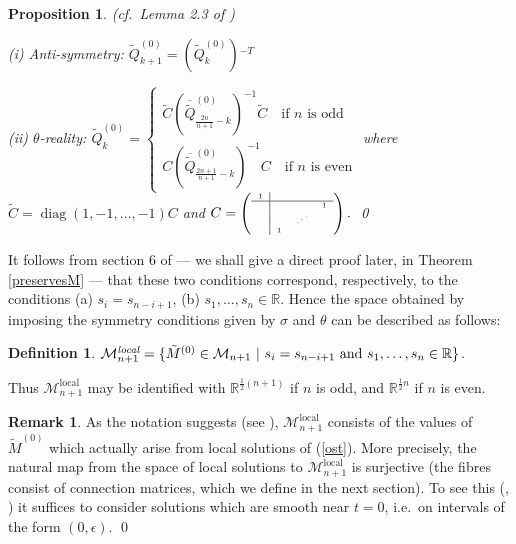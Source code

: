 \documentclass[a4paper,12pt,leqno]{amsart}
\numberwithin{equation}{section}
\theoremstyle{plain}
\newtheorem{proposition}[theorem]{Proposition}
\newtheorem{definition}[theorem]{Definition}
\theoremstyle{definition}
\newtheorem{remark}[theorem]{Remark}
\newcommand{\R}{\mathbb R}
\newcommand{\si}{\sigma}
\newcommand{\eps}{\epsilon}
\renewcommand{\th}{\theta}
\DeclareMathOperator{\diag}{diag}
\newcommand{\cM}{\mathcal{M}}
\newcommand{\st}{\ \vert\ }
\newcommand{\tQz}{  \tilde Q^{(0)}  }
\newcommand{\tMz}{  \tilde M^{(0)}  }
\newcommand{\tC}{  \tilde C }
\newcommand{\bartQz}{  {\overline{\tilde Q}}^{(0)}  }
\begin{document}
\begin{proposition}\label{sithM} (cf.\ Lemma 2.3 of \cite{GIL2})

\noindent (i) Anti-symmetry:     $\tQz_{k+1} = (\tQz_k){}^{-T}$

\noindent (ii) $\theta$-reality:   $\tQz_k=
\begin{cases}
\tC
\left(
\bartQz_{ \scriptstyle\frac{2n}{n+1}-k}
\right)^{-1}
\tC
\quad\text{if $n$ is odd}
\\
C
\left(
\bartQz_{ \scriptstyle\frac{2n+1}{n+1}-k}
\right)^{-1}
C
\quad\text{if $n$ is even}
\end{cases}
$
\newline
where
$\tC
= \diag(1,-1,\dots,-1)C$ and
$
C=
\tiny
\left(
\begin{array}{c|ccc}
1 & & &  \\
\hline
  &  &  & 1 \\
  &  &  \iddots &  \\
  & 1 &  &
\end{array}
\right).
$
\qed
\end{proposition}

It follows from section 6 of \cite{GILX}
--- we shall give a direct proof later, in Theorem \ref{preservesM} ---
that these two conditions correspond, respectively, to the conditions
(a) $s_i=s_{n-i+1}$, (b) $s_1,\dots,s_n\in\R$.  Hence the space
obtained by imposing the symmetry conditions given by $\si$ and $\th$
can be described as follows:

\begin{definition}\label{scriptMlocal}
$\cM_{n+1}^{\text{\em local}}=
\{ \tMz \in \cM_{n+1} \st s_i=s_{n-i+1} \text{ and } s_1,\dots,s_n\in\R\}$.
\end{definition}

Thus $\cM_{n+1}^{\text{local}}$
may be identified with
$\R^{ \tfrac12(n+1)}$ if $n$ is odd, and
$\R^{ \tfrac12n}$ if $n$ is even.

\begin{remark}\label{localzero}
As the notation suggests (see \cite{GH1}), $\cM_{n+1}^{\text{local}}$ consists of the values of $\tMz$
which actually arise from local solutions of (\ref{ost}).
More precisely,  the natural map
from the space of local solutions to  $\cM_{n+1}^{\text{local}}$ is surjective (the fibres
consist of connection matrices, which we
define in the next section).  To see this (\cite{GH1}, \cite{GILX})
it suffices to consider solutions which are
smooth near $t=0$, i.e.\ on intervals of the form $(0,\eps)$.
\qed
\end{remark}
\end{document}
